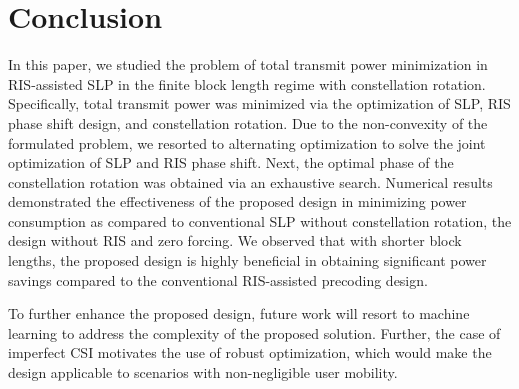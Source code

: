 \documentclass[10pt,conference]{IEEEtran}
\begin{document}
\section{Conclusion}\label{sec:Conclusion}
In this paper, we studied the problem of total transmit power minimization in RIS-assisted SLP in the finite block length regime with constellation rotation. Specifically, total transmit power was minimized via the optimization of SLP, RIS phase shift design, and constellation rotation. Due to the non-convexity of the formulated problem, we resorted to alternating optimization to solve the joint optimization of SLP and RIS phase shift. Next, the optimal phase of the constellation rotation was obtained via an exhaustive search. Numerical results demonstrated the effectiveness of the proposed design in minimizing power consumption as compared to conventional SLP without constellation rotation, the design without RIS and zero forcing. We observed that with shorter block lengths, the proposed design is highly beneficial in obtaining significant power savings compared to the conventional RIS-assisted precoding design.

To further enhance the proposed design, future work will resort to machine learning to address the complexity of the proposed solution. Further, the case of imperfect CSI motivates the use of robust optimization,  which would make the design applicable to scenarios with non-negligible user mobility.


\end{document}
